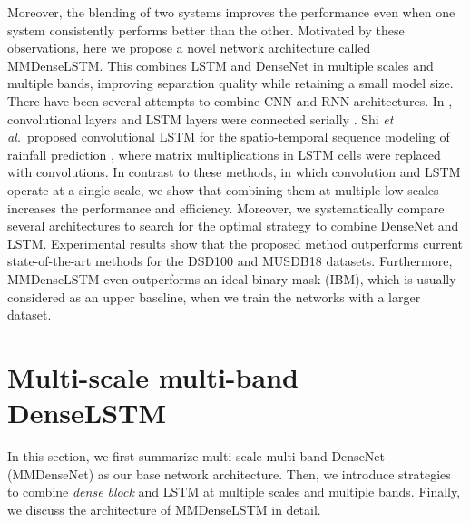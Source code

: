\documentclass{article}
\newcommand{\etal}{\textit{et al.}}
\begin{document}
Moreover, the blending of two systems improves the performance even when one system consistently performs better than the other\cite{Uhlich17}. Motivated by these observations, here we propose a novel network architecture called MMDenseLSTM. This combines LSTM and DenseNet in multiple scales and multiple bands, improving separation quality while retaining a small model size. 
There have been several attempts to combine CNN and RNN architectures. In \cite{Sainath15, Zhao18}, convolutional layers and LSTM layers were connected serially . Shi \etal~proposed convolutional LSTM for the spatio-temporal sequence modeling of rainfall prediction \cite{Shi15}, where matrix multiplications in LSTM cells were replaced with convolutions. In contrast to these methods, in which convolution and LSTM operate at a single scale, we show that combining them at multiple low scales increases the performance and efficiency. Moreover, we systematically compare several architectures to search for the optimal strategy to combine DenseNet and LSTM. Experimental results show that the proposed method outperforms current state-of-the-art methods for the DSD100 and MUSDB18 datasets. Furthermore, MMDenseLSTM even outperforms an ideal binary mask (IBM), which is usually considered as an upper baseline, when we train the networks with a larger dataset. 









\section{Multi-scale multi-band DenseLSTM}
In this section, we first summarize multi-scale multi-band DenseNet (MMDenseNet) as our base network architecture. Then, we introduce strategies to combine {\it dense block}  and LSTM at multiple scales and multiple bands. 
Finally, we discuss the architecture of MMDenseLSTM in detail.
\end{document}
